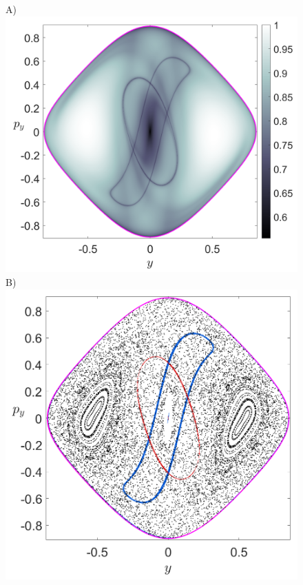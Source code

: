 \documentclass[10pt,aps,onecolumn,superscriptaddress]{revtex4-2}
\begin{document}
\begin{figure}[htbp]
	A)\includegraphics[scale=0.28]{H_-01_LD_tau_12_x_1.png}
	B)\includegraphics[scale=0.28]{H_-01_mani_tau_12_x_1.png}	

\end{figure}
\end{document}
